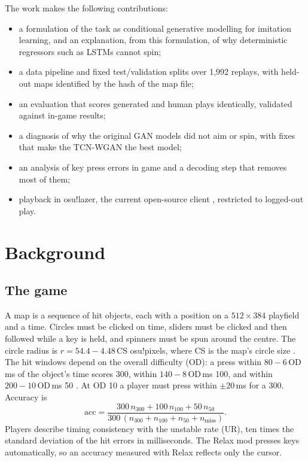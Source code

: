 \documentclass[11pt,a4paper]{article}
\begin{document}
The work makes the following contributions:
\begin{itemize}
  \item a formulation of the task as conditional generative modelling for imitation learning, and an
        explanation, from this formulation, of why deterministic regressors such as LSTMs cannot spin;
  \item a data pipeline and fixed test/validation splits over 1{,}992 replays, with held-out maps
        identified by the hash of the map file;
  \item an evaluation that scores generated and human plays identically, validated against in-game results;
  \item a diagnosis of why the original GAN models did not aim or spin, with fixes that make the
        TCN-WGAN the best model;
  \item an analysis of key press errors in game and a decoding step that removes most of them;
  \item playback in osu!lazer, the current open-source client \citep{lazer}, restricted to logged-out play.
\end{itemize}

\section{Background}
\subsection{The game}
A map is a sequence of hit objects, each with a position on a $512\times384$ playfield and a time. Circles
must be clicked on time, sliders must be clicked and then followed while a key is held, and spinners must
be spun around the centre. The circle radius is $r = 54.4-4.48\,\mathrm{CS}$ osu!pixels, where CS is the
map's circle size \citep{wikics}. The hit windows depend on the overall difficulty (OD): a press within
$80-6\,\mathrm{OD}$\,ms of the object's time scores 300, within $140-8\,\mathrm{OD}$\,ms 100, and within
$200-10\,\mathrm{OD}$\,ms 50 \citep{wikiod}. At OD 10 a player must press within $\pm20$\,ms for a 300.
Accuracy is
\begin{equation}
  \mathrm{acc}=\frac{300\,n_{300}+100\,n_{100}+50\,n_{50}}{300\,(n_{300}+n_{100}+n_{50}+n_{\mathrm{miss}})}.
  \label{eq:acc}
\end{equation}
Players describe timing consistency with the unstable rate (UR), ten times the standard deviation of the
hit errors in milliseconds. The Relax mod presses keys automatically, so an accuracy measured with Relax
reflects only the cursor.
\end{document}
